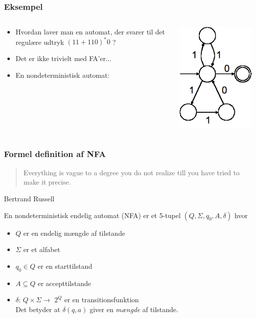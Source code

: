 \begin{frame}
\frametitle{Eksempel}

\begin{columns}
  \begin{column}{9cm}
    \begin{itemize}[<+->]
    \item Hvordan laver man en automat, der svarer til det regulære
      udtryk $(11 + 110)^*0$ ?

    \item Det er ikke trivielt med FA’er...

    \item En nondeterministisk automat:
    \end{itemize}
  \end{column}
\pause
  \begin{column}{5cm}
      \includegraphics[scale=0.4]{images/2_seminar_nondet}
  \end{column}
\end{columns}
\end{frame}
\begin{frame}
\frametitle{Formel definition af NFA}
\begin{verse}
Everything is vague to a degree you do not realize till you have tried to make it precise.
\end{verse}
    Bertrand Russell

    \bigskip  

\pause
En nondeterministisk endelig automat (NFA) er et 5-tupel $(Q, \Sigma, q_0, A, \delta)$ hvor
 
\begin{itemize}[<+->]
\item $Q$ er en endelig mængde af tilstande
\item $\Sigma$ er et alfabet
\item $q_0\in Q$ er en starttilstand
\item $A\subseteq Q$ er accepttilstande
\item $\delta$: $Q\times \Sigma \rightarrow$ \alert{$2^Q$} er en transitionsfunktion\\
  Det betyder at $\delta(q,a)$ giver en \emph{mængde} af tilstande.
\end{itemize}
\end{frame}
